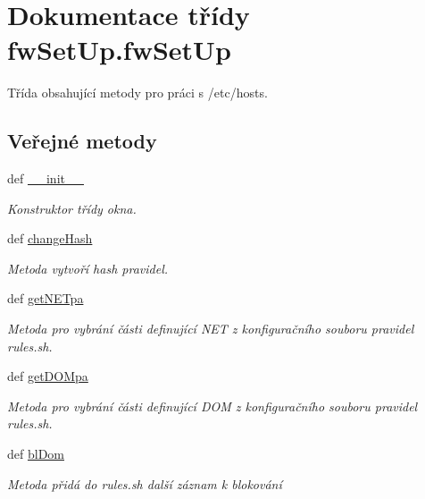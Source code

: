 \hypertarget{classfwSetUp_1_1fwSetUp}{\section{Dokumentace třídy fw\-Set\-Up.\-fw\-Set\-Up}
\label{dd/dd2/classfwSetUp_1_1fwSetUp}
}


Třída obsahující metody pro práci s /etc/hosts.  


\subsection*{Veřejné metody}
\begin{DoxyCompactItemize}
\item 
def \hyperlink{classfwSetUp_1_1fwSetUp_ad05f56aa9dd4503852ec2bcfb2a3afe2}{\-\_\-\-\_\-init\-\_\-\-\_\-}
\begin{DoxyCompactList}\small\item\em Konstruktor třídy okna. \end{DoxyCompactList}\item 
def \hyperlink{classfwSetUp_1_1fwSetUp_a57a5083c1005240c9283b272cb201f5e}{change\-Hash}
\begin{DoxyCompactList}\small\item\em Metoda vytvoří hash pravidel. \end{DoxyCompactList}\item 
def \hyperlink{classfwSetUp_1_1fwSetUp_a280e0fbdf7efa6835fee31650a79e02b}{get\-N\-E\-Tpa}
\begin{DoxyCompactList}\small\item\em Metoda pro vybrání části definující N\-E\-T z konfiguračního souboru pravidel rules.\-sh. \end{DoxyCompactList}\item 
def \hyperlink{classfwSetUp_1_1fwSetUp_a29cba8b25408c6c37632e9e969343f3b}{get\-D\-O\-Mpa}
\begin{DoxyCompactList}\small\item\em Metoda pro vybrání části definující D\-O\-M z konfiguračního souboru pravidel rules.\-sh. \end{DoxyCompactList}\item 
def \hyperlink{classfwSetUp_1_1fwSetUp_aea3760656409015f15b9b3450edd70e1}{bl\-Dom}
\begin{DoxyCompactList}\small\item\em Metoda přidá do rules.\-sh další záznam k blokování \end{DoxyCompactList}\item 

\end{DoxyCompactItemize}
